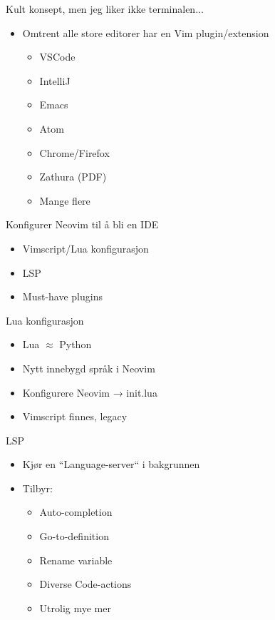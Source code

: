 \documentclass{beamer}
\begin{document}
\begin{frame}{Kult konsept, men jeg liker ikke terminalen...}
	\begin{itemize}
		\item Omtrent alle store editorer har en Vim plugin/extension
		      \begin{itemize}
			      \item VSCode
			      \item IntelliJ
			      \item Emacs
			      \item Atom
			      \item Chrome/Firefox
			      \item Zathura (PDF)
			      \item Mange flere
		      \end{itemize}
	\end{itemize}
\end{frame}

\begin{frame}{Konfigurer Neovim til å bli en IDE}
	\begin{itemize}
		\item Vimscript/Lua konfigurasjon
		\item LSP
		\item Must-have plugins
	\end{itemize}
\end{frame}

\begin{frame}{Lua konfigurasjon}
	\begin{itemize}
		\item Lua $\approx$ Python
		\item Nytt innebygd språk i Neovim
		\item Konfigurere Neovim → init.lua
		\item Vimscript finnes, legacy
	\end{itemize}
\end{frame}


\begin{frame}{LSP}
	\begin{itemize}
		\item Kjør en ``Language-server`` i bakgrunnen
		\item Tilbyr:
		      \begin{itemize}
			      \item Auto-completion
			      \item Go-to-definition
			      \item Rename variable
			      \item Diverse Code-actions
			      \item Utrolig mye mer
		      \end{itemize}
	\end{itemize}
\end{frame}
\end{document}
